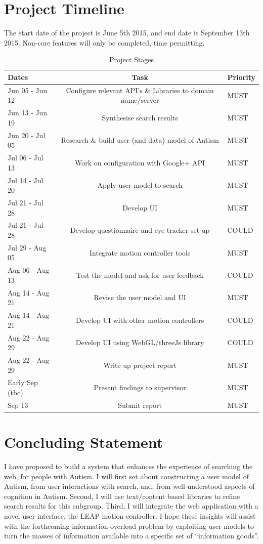 \documentclass[a4paper, 11pt]{article}
\begin{document}
\begin{justify}
\section{Project Timeline}\label{plan}
The start date of the project is June 5th 2015, and end date is September 13th 2015. Non-core features will only be completed, time permitting.
\begin{table}[H]
\caption{Project Stages} 
\centering
\begin{tabular}{ | L |c| L |}
\hline\hline 
Dates & Task & Priority\\ [0.5ex]
\hline 
Jun 05 - Jun 12 & Configure relevant API's \& Libraries to domain name/server & MUST\\
\hline 
Jun 13 - Jun 19 & Synthesise search results & MUST\\
\hline 
Jun 20 - Jul 05 & Research \& build user (and data) model of Autism & MUST\\
\hline 
Jul 06 - Jul 13 & Work on configuration with Google+ API & MUST\\
\hline 
Jul 14 - Jul 20 & Apply user model to search& MUST\\ 
\hline 
Jul 21 - Jul 28 & Develop UI & MUST\\
\hline 
Jul 21 - Jul 28 & Develop questionnaire and eye-tracker set up & COULD\\
\hline 
Jul 29 - Aug 05 & Integrate motion controller tools& MUST\\
\hline 
Aug 06 - Aug 13 & Test the model and ask for user feedback & COULD\\
\hline 
Aug 14 - Aug 21 & Revise the user model and UI & MUST\\
\hline 
Aug 14 - Aug 21 & Develop UI with other motion controllers & COULD\\
\hline 
Aug 22 - Aug 29 & Develop UI using WebGL/threeJs library & COULD\\
\hline 
Aug 22 - Aug 29 & Write up project report & MUST\\ 
\hline 
Early Sep (tbc) & Present findings to supervisor & MUST\\
\hline 
Sep 13 & Submit report & MUST\\[0.5ex]
\hline
\end{tabular}
\label{stages} 
\end{table}

\section{Concluding Statement}\label{future}
I have proposed to build a system that enhances the experience of searching the web, for people with Autism. I will first set about constructing a user model of Autism, from user interactions with search, and, from well-understood aspects of cognition in Autism. Second, I will use text/content based libraries to refine search results for this subgroup. Third, I will integrate the web application with a novel user interface, the LEAP motion controller. I hope these insights will assist with the forthcoming information-overload problem by exploiting user models to turn the masses of information available into a specific set of “information goods”.


\end{justify}
\end{document}
